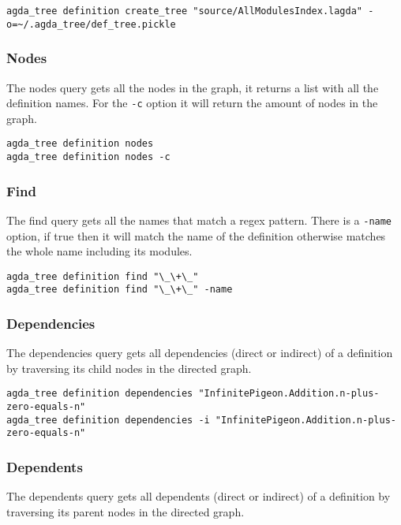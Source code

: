 \begin{lstlisting}
agda_tree definition create_tree "source/AllModulesIndex.lagda" -o=~/.agda_tree/def_tree.pickle
\end{lstlisting}

\subsubsection{Nodes}

The nodes query gets all the nodes in the graph, it returns a list with all the
definition names. For the \texttt{-c} option it will return the amount of nodes
in the graph. 

\begin{lstlisting}
agda_tree definition nodes
agda_tree definition nodes -c
\end{lstlisting}

\subsubsection{Find}

The find query gets all the names that match a regex pattern. There is a
\texttt{-name} option, if true then it will match the name of the definition
otherwise matches the whole name including its modules.

\begin{lstlisting}
agda_tree definition find "\_\+\_"
agda_tree definition find "\_\+\_" -name
\end{lstlisting}

\subsubsection{Dependencies}

The dependencies query gets all dependencies (direct or indirect) of a
definition by traversing its child nodes in the directed graph.

\begin{lstlisting}
agda_tree definition dependencies "InfinitePigeon.Addition.n-plus-zero-equals-n"
agda_tree definition dependencies -i "InfinitePigeon.Addition.n-plus-zero-equals-n"
\end{lstlisting}

\subsubsection{Dependents}


The dependents query gets all dependents (direct or indirect) of a
definition by traversing its parent nodes in the directed graph.

